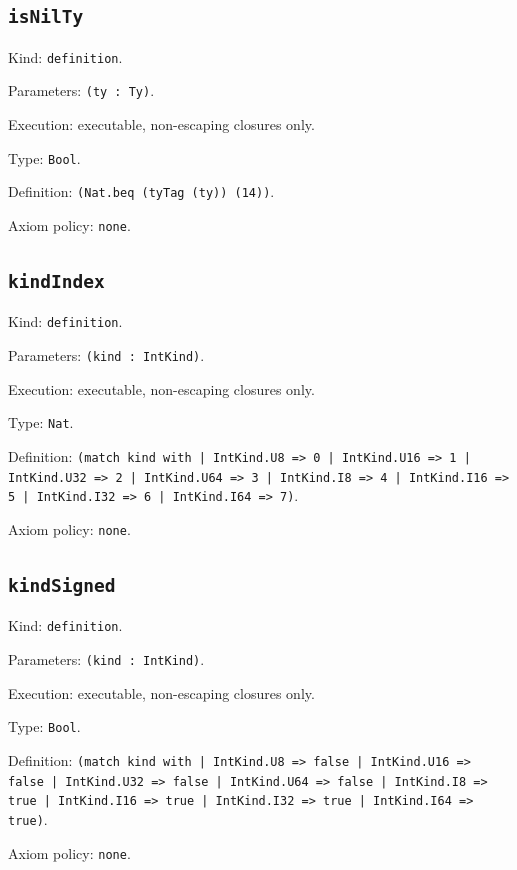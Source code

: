 \documentclass[11pt]{article}
\begin{document}
\subsection*{\texttt{isNilTy}}
\noindent Kind: \texttt{definition}.\par
\noindent Parameters: \texttt{(ty : Ty)}.\par
\noindent Execution: executable, non-escaping closures only.\par
\noindent Type: \texttt{Bool}.\par
\noindent Definition: \texttt{(Nat.beq (tyTag (ty)) (14))}.\par
\noindent Axiom policy: \texttt{none}.\par
\subsection*{\texttt{kindIndex}}
\noindent Kind: \texttt{definition}.\par
\noindent Parameters: \texttt{(kind : IntKind)}.\par
\noindent Execution: executable, non-escaping closures only.\par
\noindent Type: \texttt{Nat}.\par
\noindent Definition: \texttt{(match kind with | IntKind.U8 => 0 | IntKind.U16 => 1 | IntKind.U32 => 2 | IntKind.U64 => 3 | IntKind.I8 => 4 | IntKind.I16 => 5 | IntKind.I32 => 6 | IntKind.I64 => 7)}.\par
\noindent Axiom policy: \texttt{none}.\par
\subsection*{\texttt{kindSigned}}
\noindent Kind: \texttt{definition}.\par
\noindent Parameters: \texttt{(kind : IntKind)}.\par
\noindent Execution: executable, non-escaping closures only.\par
\noindent Type: \texttt{Bool}.\par
\noindent Definition: \texttt{(match kind with | IntKind.U8 => false | IntKind.U16 => false | IntKind.U32 => false | IntKind.U64 => false | IntKind.I8 => true | IntKind.I16 => true | IntKind.I32 => true | IntKind.I64 => true)}.\par
\noindent Axiom policy: \texttt{none}.\par
\end{document}
